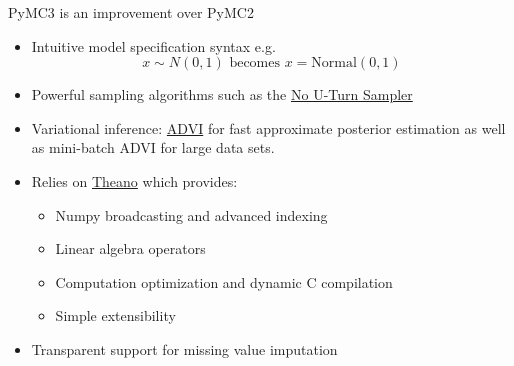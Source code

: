 \documentclass[table,dvipsnames]{beamer}
\newcommand{\highlt}{\textcolor{NavyBlue}}
\begin{document}
\begin{frame}[fragile]
\begin{block}{PyMC3 is an improvement over PyMC2}
\begin{itemize}
 \item Intuitive model specification syntax e.g. \\
 \begin{equation*}
 x \sim N(0,1) \textrm{ becomes } x = \textrm{Normal}(0,1)
 \end{equation*}
 \item Powerful sampling algorithms such as the \href{http://arxiv.org/abs/1111.4246}{No U-Turn Sampler}
 \item \highlt{Variational inference}: \href{http://arxiv.org/abs/1506.03431}{ADVI} for fast approximate posterior estimation as well as \highlt{mini-batch} ADVI for large data sets.
 \item Relies on \href{http://deeplearning.net/software/theano}{Theano} which provides:
 \begin{itemize}
 \item Numpy broadcasting and advanced indexing
 \item Linear algebra operators
 \item Computation optimization and dynamic C compilation
 \item Simple extensibility
 \end{itemize}
 \item Transparent support for \highlt{missing value imputation}
\end{itemize}
\end{block}
\end{frame}

\end{document}
